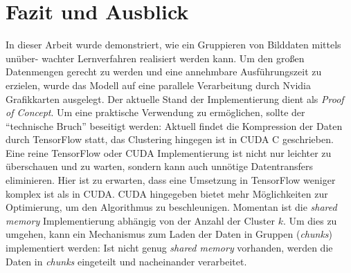 \chapter{Fazit und Ausblick}

In dieser Arbeit wurde demonstriert, wie ein Gruppieren von Bilddaten mittels unüber- wachter Lernverfahren realisiert werden kann. Um den großen Datenmengen gerecht zu werden und eine annehmbare Ausführungszeit zu erzielen, wurde das Modell auf eine parallele Verarbeitung durch Nvidia Grafikkarten ausgelegt. Der aktuelle Stand der Implementierung dient als \textit{Proof of Concept}. Um eine praktische Verwendung zu ermöglichen, sollte der \enquote{technische Bruch} beseitigt werden: Aktuell findet die Kompression der Daten durch TensorFlow statt, das Clustering hingegen ist in CUDA C geschrieben. Eine reine TensorFlow oder CUDA Implementierung ist nicht nur leichter zu überschauen und zu warten, sondern kann auch unnötige Datentransfers eliminieren. Hier ist zu erwarten, dass eine Umsetzung in TensorFlow weniger komplex ist als in CUDA. CUDA hingegeben bietet mehr Möglichkeiten zur Optimierung, um den Algorithmus zu beschleunigen. Momentan ist die \textit{shared memory} Implementierung abhängig von der Anzahl der Cluster $k$. Um dies zu umgehen, kann ein Mechanismus zum Laden der Daten in Gruppen (\textit{chunks}) implementiert werden: Ist nicht genug \textit{shared memory} vorhanden, werden die Daten in \textit{chunks} eingeteilt und nacheinander verarbeitet.